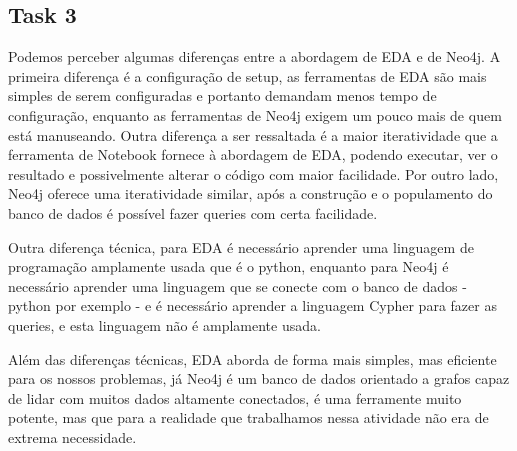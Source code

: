 \documentclass[
	10pt,
	parskip=half-,		
	paper=a4,			
	english, portuguese		
	]{scrartcl}
\begin{document}
    \subsection{Task 3}
    Podemos perceber algumas diferenças entre a abordagem de EDA e de Neo4j. A primeira diferença é a configuração de setup, as ferramentas de EDA são mais simples de serem configuradas e portanto demandam menos tempo de configuração, enquanto as ferramentas de Neo4j exigem um pouco mais de quem está manuseando. Outra diferença a ser ressaltada é a maior iteratividade que a ferramenta de Notebook fornece à abordagem de EDA, podendo executar, ver o resultado e possivelmente alterar o código com maior facilidade. Por outro lado, Neo4j oferece uma iteratividade similar, após a construção e o populamento do banco de dados é possível fazer queries com certa facilidade.
    
    Outra diferença técnica, para EDA é necessário aprender uma linguagem de programação amplamente usada que é o python, enquanto para Neo4j é necessário aprender uma linguagem que se conecte com o banco de dados - python por exemplo - e é necessário aprender a linguagem Cypher para fazer as queries, e esta linguagem não é amplamente usada.
    
    Além das diferenças técnicas, EDA aborda de forma mais simples, mas eficiente para os nossos problemas, já Neo4j é um banco de dados orientado a grafos capaz de lidar com muitos dados altamente conectados, é uma ferramente muito potente, mas que para a realidade que trabalhamos nessa atividade não era de extrema necessidade.
\end{document}
